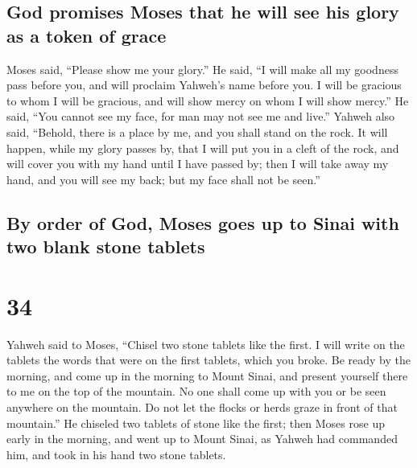 \hypertarget{god-promises-moses-that-he-will-see-his-glory-as-a-token-of-grace}{%
\subsection{God promises Moses that he will see his glory as a token of
grace}\label{god-promises-moses-that-he-will-see-his-glory-as-a-token-of-grace}}

 Moses said, ``Please show me your glory.''
 He said, ``I will make all my goodness pass before you,
and will proclaim Yahweh's name before you. I will be gracious to whom I
will be gracious, and will show mercy on whom I will show mercy.''
 He said, ``You cannot see my face, for man may not see
me and live.''  Yahweh also said, ``Behold, there is a
place by me, and you shall stand on the rock.  It will
happen, while my glory passes by, that I will put you in a cleft of the
rock, and will cover you with my hand until I have passed by;
 then I will take away my hand, and you will see my back;
but my face shall not be seen.''

\hypertarget{by-order-of-god-moses-goes-up-to-sinai-with-two-blank-stone-tablets}{%
\subsection{By order of God, Moses goes up to Sinai with two blank stone
tablets}\label{by-order-of-god-moses-goes-up-to-sinai-with-two-blank-stone-tablets}}

\hypertarget{section-33}{%
\section{34}\label{section-33}}

 Yahweh said to Moses, ``Chisel two stone tablets like the
first. I will write on the tablets the words that were on the first
tablets, which you broke.  Be ready by the morning, and
come up in the morning to Mount Sinai, and present yourself there to me
on the top of the mountain.  No one shall come up with you
or be seen anywhere on the mountain. Do not let the flocks or herds
graze in front of that mountain.''  He chiseled two
tablets of stone like the first; then Moses rose up early in the
morning, and went up to Mount Sinai, as Yahweh had commanded him, and
took in his hand two stone tablets.

